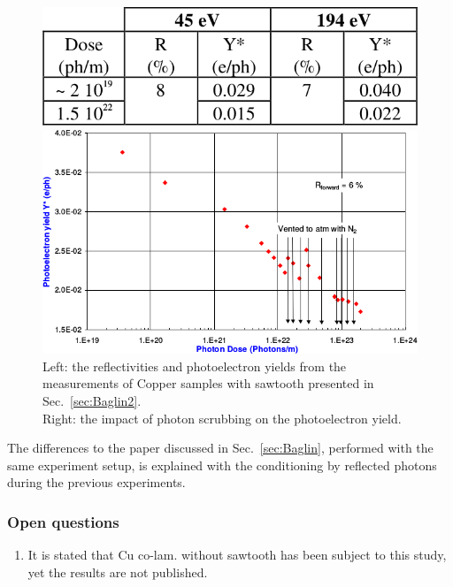 \begin{figure}[tbh]
    \centering
    \begin{minipage}[c]{0.37\textwidth}
        \includegraphics[width=\textwidth]{../ss/experiment_baglin2.png}
    \end{minipage}
    \hspace{0.5cm}
    \begin{minipage}[c]{0.57\textwidth}
        \includegraphics[width=1\textwidth]{../ss/photoelectron_scrubbing_baglin2.png}
    \end{minipage}
    \caption{
        Left: the reflectivities and photoelectron yields from the measurements of Copper samples with sawtooth presented in Sec.~\ref{sec:Baglin2}.
        \\
        Right: the impact of photon scrubbing on the photoelectron yield.
    }
    \label{fig:baglin2_scrubbing}

\end{figure}


The differences to the paper discussed in Sec.~\ref{sec:Baglin}, performed with the same experiment setup, is explained with the conditioning by reflected photons during the previous experiments.

\subsubsection{Open questions}

\begin{enumerate}
    \item It is stated that Cu co-lam. without sawtooth has been subject to this study, yet the results are not published.
\end{enumerate}

